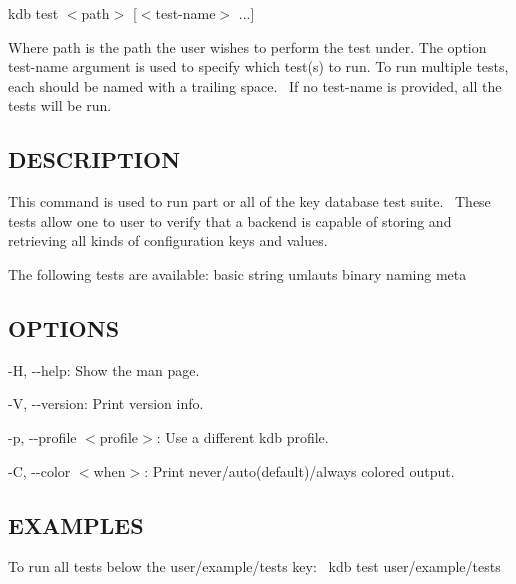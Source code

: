 {\ttfamily kdb test $<$path$>$ \mbox{[}$<$test-\/name$>$ ...\mbox{]}}~\newline


Where {\ttfamily path} is the path the user wishes to perform the test under. The option {\ttfamily test-\/name} argument is used to specify which test(s) to run. To run multiple tests, each should be named with a trailing space.~\newline
 If no {\ttfamily test-\/name} is provided, all the tests will be run.~\newline


\subsection*{D\+E\+S\+C\+R\+I\+P\+T\+I\+ON}

This command is used to run part or all of the key database test suite.~\newline
 These tests allow one to user to verify that a backend is capable of storing and retrieving all kinds of configuration keys and values.~\newline


The following tests are available\+: basic string umlauts binary naming meta~\newline


\subsection*{O\+P\+T\+I\+O\+NS}


\begin{DoxyItemize}
\item {\ttfamily -\/H}, {\ttfamily -\/-\/help}\+: Show the man page.
\item {\ttfamily -\/V}, {\ttfamily -\/-\/version}\+: Print version info.
\item {\ttfamily -\/p}, {\ttfamily -\/-\/profile $<$profile$>$}\+: Use a different kdb profile.
\item {\ttfamily -\/C}, {\ttfamily -\/-\/color $<$when$>$}\+: Print never/auto(default)/always colored output.
\end{DoxyItemize}

\subsection*{E\+X\+A\+M\+P\+L\+ES}

To run all tests below the {\ttfamily user/example/tests} key\+:~\newline
 {\ttfamily kdb test user/example/tests}~\newline


